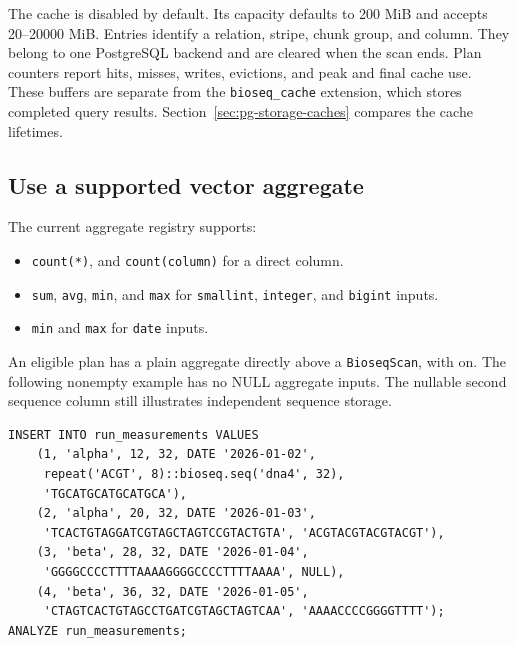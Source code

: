 The cache is disabled by default. Its capacity defaults to 200 MiB and
accepts 20--20000 MiB. Entries identify a relation, stripe, chunk group,
and column. They belong to one PostgreSQL backend and are cleared when
the scan ends. Plan counters report hits, misses, writes, evictions, and
peak and final cache use. These buffers are separate from the
\texttt{bioseq\_cache} extension, which stores completed query results.
Section~\ref{sec:pg-storage-caches} compares the cache lifetimes.

\subsection{Use a supported vector aggregate}

The current aggregate registry supports:
\begin{itemize}
  \item \texttt{count(*)}, and \texttt{count(column)} for a direct column.
  \item \texttt{sum}, \texttt{avg}, \texttt{min}, and \texttt{max} for
    \texttt{smallint}, \texttt{integer}, and \texttt{bigint} inputs.
  \item \texttt{min} and \texttt{max} for \texttt{date} inputs.
\end{itemize}

An eligible plan has a plain aggregate directly above a
\texttt{BioseqScan}, with  on.
The following nonempty example has no NULL aggregate inputs. The nullable
second sequence column still illustrates independent sequence storage.

\par\noindent\begin{minipage}{\linewidth}
\begin{lstlisting}[style=bioseq-appendix-sql,
  caption={Load a small table for inspecting the aggregate path.}]
INSERT INTO run_measurements VALUES
    (1, 'alpha', 12, 32, DATE '2026-01-02',
     repeat('ACGT', 8)::bioseq.seq('dna4', 32),
     'TGCATGCATGCATGCA'),
    (2, 'alpha', 20, 32, DATE '2026-01-03',
     'TCACTGTAGGATCGTAGCTAGTCCGTACTGTA', 'ACGTACGTACGTACGT'),
    (3, 'beta', 28, 32, DATE '2026-01-04',
     'GGGGCCCCTTTTAAAAGGGGCCCCTTTTAAAA', NULL),
    (4, 'beta', 36, 32, DATE '2026-01-05',
     'CTAGTCACTGTAGCCTGATCGTAGCTAGTCAA', 'AAAACCCCGGGGTTTT');
ANALYZE run_measurements;
\end{lstlisting}
\end{minipage}

